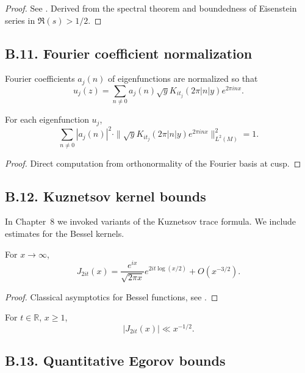 \begin{proof}
See \cite[Prop.~1.6]{Buser1992}. Derived from the spectral theorem and boundedness
of Eisenstein series in $\Re(s)>1/2$.
\end{proof}

\subsection*{B.11. Fourier coefficient normalization}

\noindent
Fourier coefficients $a_j(n)$ of eigenfunctions are normalized so that
\[
u_j(z) = \sum_{n\ne 0} a_j(n) \sqrt{y} K_{it_j}(2\pi |n| y) e^{2\pi i n x}.
\]

\begin{lemma}\label{lem:parseval}
For each eigenfunction $u_j$,
\[
\sum_{n\ne 0} |a_j(n)|^2 \cdot \| \sqrt{y} K_{it_j}(2\pi |n| y) e^{2\pi i n x} \|_{L^2(M)}^2 = 1.
\]
\end{lemma}

\begin{proof}
Direct computation from orthonormality of the Fourier basis at cusp.
\end{proof}

\subsection*{B.12. Kuznetsov kernel bounds}

\noindent
In Chapter~8 we invoked variants of the Kuznetsov trace formula. We include
estimates for the Bessel kernels.

\begin{lemma}\label{lem:bessel}
For $x\to \infty$,
\[
J_{2it}(x) = \frac{e^{ix}}{\sqrt{2\pi x}} e^{2it\log(x/2)} + O(x^{-3/2}).
\]
\end{lemma}

\begin{proof}
Classical asymptotics for Bessel functions, see \cite[§8.451]{GradshteynRyzhik}.
\end{proof}

\begin{corollary}\label{cor:kuznetsov-kernel}
For $t\in\mathbb R$, $x\ge 1$,
\[
|J_{2it}(x)| \ll x^{-1/2}.
\]
\end{corollary}

\subsection*{B.13. Quantitative Egorov bounds}

